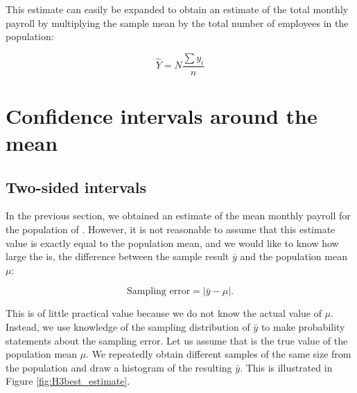 


\bigskip

This estimate can easily be expanded to obtain an estimate of the total monthly payroll by multiplying the sample mean by the total number of employees in the population:

\begin{equation}
  \hat{Y} = N\frac{\sum y_i}{n} 
  \label{eq:estimate_total}
\end{equation} 




\section{Confidence intervals around the mean} %
\label{sec:confidence_intervals}

\subsection{Two-sided intervals} %
\label{sub:two_sided_intervals}

In the previous section, we obtained an estimate of the mean monthly payroll for the population of \EstMeanPointEstimate. However, it is not reasonable to assume that this estimate value is exactly equal to the population mean, and we would like to know how large the  is, the difference between the sample result $\bar{y}$ and the population mean $\mu$:

\begin{equation}
  \textrm{Sampling error} = | \bar{y} - \mu |.
\end{equation}

This is of little practical value because we do not know the actual value of $\mu$. Instead, we use knowledge of the sampling distribution of $\bar{y}$ to make probability statements about the sampling error. Let us assume that \EstMeanPointEstimate is the true value of the population mean $\mu$. We repeatedly obtain different samples of the same size from the population and draw a histogram of the resulting $\bar{y}$. This is illustrated in Figure \ref{fig:H3best_estimate}.

